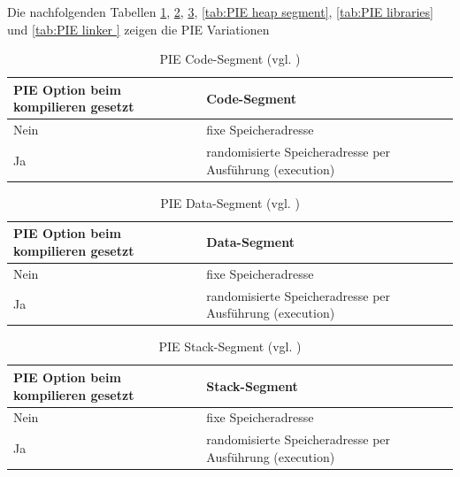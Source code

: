 Die nachfolgenden Tabellen \ref{tab:PIE executable segment}, \ref{tab:PIE data segment}, \ref{tab:PIE stack segment}, \ref{tab:PIE heap segment}, \ref{tab:PIE libraries} und \ref{tab:PIE linker } zeigen die PIE Variationen

 \begin{table}
    \begin{center}
         \begin{tabular}{|p{4cm}|p{11cm}|} \hline
            PIE Option beim kompilieren gesetzt & Code-Segment \\ \hline
            Nein & fixe Speicheradresse\\ \hline
            Ja & randomisierte Speicheradresse per Ausführung (execution)\\ \hline
        \end{tabular}
        \caption{PIE Code-Segment (vgl. \cite{iOSSec[5]}) }
       \label{tab:PIE executable segment}
    \end{center}
\end{table}

 \begin{table}
    \begin{center}
       \begin{tabular}{|p{4cm}|p{11cm}|} \hline
            PIE Option beim kompilieren gesetzt & Data-Segment\\ \hline
            Nein & fixe Speicheradresse\\ \hline
            Ja & randomisierte Speicheradresse per Ausführung (execution)\\ \hline
        \end{tabular}
        \caption{PIE Data-Segment (vgl. \cite{iOSSec[5]})}
       \label{tab:PIE data segment}
    \end{center}
\end{table}

\begin{table}
    \begin{center}
       \begin{tabular}{|p{4cm}|p{11cm}|} \hline
            PIE Option beim kompilieren gesetzt & Stack-Segment\\ \hline
            Nein & fixe Speicheradresse\\ \hline
             Ja & randomisierte Speicheradresse per Ausführung (execution)\\ \hline
        \end{tabular}
         \caption{PIE Stack-Segment (vgl. \cite{iOSSec[5]})}
       \label{tab:PIE stack segment}
    \end{center}
\end{table}    

